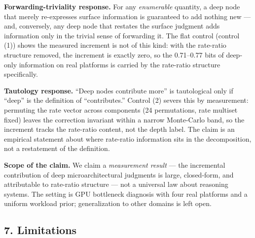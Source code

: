 {{{{\textbf{Forwarding-triviality response.} For any \emph{enumerable} quantity, a deep node that merely re-expresses surface information is guaranteed to add nothing new --- and, conversely, any deep node that restates the surface judgment adds information only in the trivial sense of forwarding it. The flat control (control (1)) shows the measured increment is not of this kind: with the rate-ratio structure removed, the increment is exactly zero, so the 0.71--0.77 bits of deep-only information on real platforms is carried by the rate-ratio structure specifically.

\textbf{Tautology response.} ``Deep nodes contribute more'' is tautological only if ``deep'' is the definition of ``contributes.'' Control (2) severs this by measurement: permuting the rate vector across components (24 permutations, rate multiset fixed) leaves the correction invariant within a narrow Monte-Carlo band, so the increment tracks the rate-ratio content, not the depth label. The claim is an empirical statement about where rate-ratio information sits in the decomposition, not a restatement of the definition.

\textbf{Scope of the claim.} We claim a \emph{measurement result} --- the incremental contribution of deep microarchitectural judgments is large, closed-form, and attributable to rate-ratio structure --- not a universal law about reasoning systems. The setting is GPU bottleneck diagnosis with four real platforms and a uniform workload prior; generalization to other domains is left open.

\subsection{7. Limitations}\label{limitations}

}}}}
